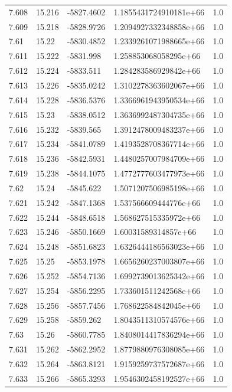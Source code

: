 \begin{tabular}{lllll}
7.608 & 15.216 & -5827.4602 & 1.1855431724910181e+66 & 1.0 \\
7.609 & 15.218 & -5828.9726 & 1.2094927332348858e+66 & 1.0 \\
7.61 & 15.22 & -5830.4852 & 1.2339261071988665e+66 & 1.0 \\
7.611 & 15.222 & -5831.998 & 1.258853068058295e+66 & 1.0 \\
7.612 & 15.224 & -5833.511 & 1.284283586929842e+66 & 1.0 \\
7.613 & 15.226 & -5835.0242 & 1.3102278363602067e+66 & 1.0 \\
7.614 & 15.228 & -5836.5376 & 1.3366961943950534e+66 & 1.0 \\
7.615 & 15.23 & -5838.0512 & 1.3636992487304735e+66 & 1.0 \\
7.616 & 15.232 & -5839.565 & 1.3912478009483237e+66 & 1.0 \\
7.617 & 15.234 & -5841.0789 & 1.4193528708367714e+66 & 1.0 \\
7.618 & 15.236 & -5842.5931 & 1.4480257007984709e+66 & 1.0 \\
7.619 & 15.238 & -5844.1075 & 1.4772777603477973e+66 & 1.0 \\
7.62 & 15.24 & -5845.622 & 1.5071207506985198e+66 & 1.0 \\
7.621 & 15.242 & -5847.1368 & 1.537566609444776e+66 & 1.0 \\
7.622 & 15.244 & -5848.6518 & 1.568627515335972e+66 & 1.0 \\
7.623 & 15.246 & -5850.1669 & 1.60031589314857e+66 & 1.0 \\
7.624 & 15.248 & -5851.6823 & 1.6326444186563023e+66 & 1.0 \\
7.625 & 15.25 & -5853.1978 & 1.6656260237003807e+66 & 1.0 \\
7.626 & 15.252 & -5854.7136 & 1.6992739013625342e+66 & 1.0 \\
7.627 & 15.254 & -5856.2295 & 1.733601511242568e+66 & 1.0 \\
7.628 & 15.256 & -5857.7456 & 1.768622584842045e+66 & 1.0 \\
7.629 & 15.258 & -5859.262 & 1.8043511310574576e+66 & 1.0 \\
7.63 & 15.26 & -5860.7785 & 1.8408014417836294e+66 & 1.0 \\
7.631 & 15.262 & -5862.2952 & 1.8779880976308085e+66 & 1.0 \\
7.632 & 15.264 & -5863.8121 & 1.9159259737572687e+66 & 1.0 \\
7.633 & 15.266 & -5865.3293 & 1.9546302458192527e+66 & 1.0 \\

\end{tabular}
